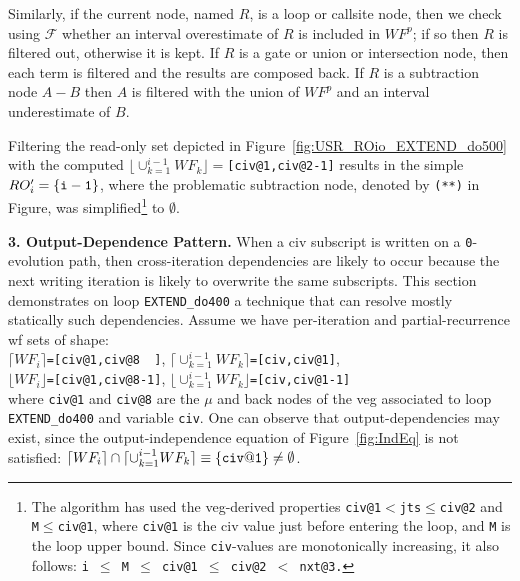 \documentclass[10pt,nocopyrightspace]{sigplanconf}
\begin{document}
Similarly, if the current node, named $R$, is a loop or callsite node, 
then we check using $\mathcal{F}$ whether an interval overestimate of 
$R$ is included in $WF^p$; if so then $R$ is filtered out, otherwise 
it is kept.  
%
If $R$ is a gate or union or intersection node,
then each term is filtered and the results are composed back. 
%
If $R$ is a subtraction node $A-B$ then $A$ is filtered with the union 
of $WF^p$ and an interval underestimate of $B$. 

Filtering the read-only set depicted in Figure~\ref{fig:USR_ROio_EXTEND_do500}
with the computed $\lfloor \cup_{k=1}^{i-1}WF_k\rfloor=${\tt[civ@1,civ@2-1]}
results in the simple $RO'_{i} = {\tt\{i-1\}}$, where the problematic 
subtraction node, denoted by {\tt (**)} in Figure, was simplified\footnote{
The algorithm has used the {\sc veg}-derived properties {\tt civ@1$<$jts$\leq$civ@2} 
and {\tt M$\leq$civ@1}, where {\tt civ@1} is the {\sc civ} value 
just before entering the loop, and {\tt M} is the loop upper bound. Since 
{\tt civ}-values are monotonically increasing, it also follows: 
{\tt i $\leq$ M $\leq$ civ@1 $\leq$ civ@2 $<$ nxt@3.}
}
to $\emptyset$.%


\vspace{1ex}

{\bf 3. Output-Dependence Pattern.} 
%
When a {\sc civ} subscript is written on a {\tt 0}-evolution path,
then cross-iteration dependencies are likely to occur because 
the next writing iteration is likely to overwrite the same subscripts.
This section demonstrates on loop {\tt EXTEND\_do400}
a technique that can resolve mostly statically such dependencies.
%
Assume we have per-iteration and partial-recurrence {\sc wf} 
sets of shape:\vspace{1ex}\\
\noindent$\lceil WF_i\rceil${\tt=[civ@1,civ@8~~]},
$\lceil\cup_{k=1}^{i-1}WF_{k} \rceil${\tt=[civ,civ@1]},\\
\noindent$\lfloor WF_i\rfloor${\tt=[civ@1,civ@8-1]},
$\lfloor\cup_{k=1}^{i-1}WF_k \rfloor${\tt=[civ,civ@1-1]}\vspace{1ex}\\
where {\tt civ@1} and {\tt civ@8} are the $\mu$ and back nodes of
the {\sc veg} associated to loop {\tt EXTEND\_do400} and variable {\tt civ}.
%
One can observe that output-dependencies may exist, since
the output-independence equation of Figure~\ref{fig:IndEq} is not satisfied:
$\lceil WF_{i}\rceil \cap \lceil \cup_{k=1}^{i-1}WF_{k} \rceil \equiv {\tt\{civ@1\}}\ne\emptyset$.
\end{document}
